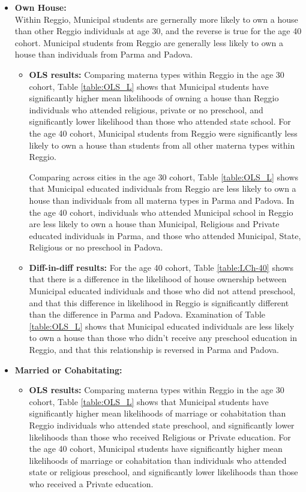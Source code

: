 \documentclass[11pt]{article}
\begin{document}
\begin{itemize}

\item \textbf{Own House:} \\
Within Reggio, Municipal students are gernerally more likely to own a house than other Reggio individuals at age 30, and the reverse is true for the age 40 cohort. Municipal students from Reggio are generally less likely to own a house than individuals from Parma and Padova.
	\begin{itemize}
	\item \textbf{OLS results:}
Comparing materna types within Reggio in the age 30 cohort, Table \ref{table:OLS_L} shows that Municipal students have significantly higher mean likelihoods of owning a house than Reggio individuals who attended religious, private or no preschool, and significantly lower likelihood than those who attended state school.  For the age 40 cohort, Municipal students from Reggio were significantly less likely to own a house than students from all other materna types within Reggio.

Comparing across cities in the age 30 cohort, Table \ref{table:OLS_L} shows that Municipal educated individuals from Reggio are less likely to own a house than individuals from all materna types in Parma and Padova. In the age 40 cohort, individuals who attended Municipal school in Reggio are less likely to own a house than Municipal, Religious and Private educated individuals in Parma, and those who attended Municipal, State, Religious or no preschool in Padova.
	
	\item \textbf{Diff-in-diff results:} For the age 40 cohort, Table \ref{table:LCh-40} shows that there is a difference in the likelihood of house ownership between Municipal educated individuals and those who did not attend preschool, and that this difference in likelihood in Reggio is significantly different than the difference in Parma and Padova. Examination of Table \ref{table:OLS_L} shows that Municipal educated individuals are less likely to own a house than those who didn't receive any preschool education in Reggio, and that this relationship is reversed in Parma and Padova.
	\end{itemize}
		
\item \textbf{Married or Cohabitating:} 
	\begin{itemize}
	\item \textbf{OLS results:}
Comparing materna types within Reggio in the age 30 cohort, Table \ref{table:OLS_L} shows that Municipal students have significantly higher mean likelihoods of marriage or cohabitation than Reggio individuals who attended state preschool, and significantly lower likelihoods than those who received Religious or Private education. For the age 40 cohort,  Municipal students have significantly higher mean likelihoods of marriage or cohabitation than  individuals who attended state or religious preschool, and significantly lower likelihoods than those who received a Private education. 


\end{itemize}
\end{itemize}
\end{document}
